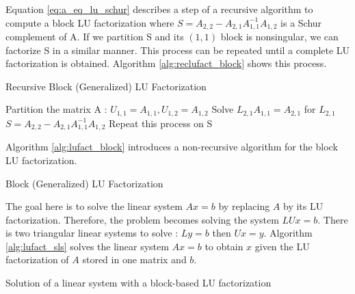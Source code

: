 Equation \ref{eq:a_eq_lu_schur} describes a step of a recursive algorithm to compute a block LU factorization where $S = A_{2,2} - A_{2,1}A_{1,1}^{-1}A_{1,2}$ is a Schur complement of A.
If we partition S and its $(1,1)$ block is nonsingular, we can factorize S in a similar manner.
This process can be repeated until a complete LU factorization is obtained.
Algorithm \ref{alg:reclufact_block} shows this process.


\begin{algorithm}[h]
	\DontPrintSemicolon
	\caption{Recursive Block (Generalized) LU Factorization\label{alg:reclufact_block}}
	Partition the matrix A : $U_{1,1} = A_{1,1},U_{1,2} = A_{1,2}$\;
	Solve $L_{2,1}A_{1,1} = A_{2,1}$ for $L_{2,1}$\;
	$S = A_{2,2} - A_{2,1}A_{1,1}^{-1}A_{1,2}$\;
	Repeat this process on S
\end{algorithm}

Algorithm \ref{alg:lufact_block} introduces a non-recursive algorithm for the block LU factorization.

\begin{algorithm}[h]
	\DontPrintSemicolon
	\caption{Block (Generalized) LU Factorization\label{alg:lufact_block}}
\end{algorithm}

The goal here is to solve the linear system $Ax = b$ by replacing $A$ by its LU factorization.
Therefore, the problem becomes solving the system $LUx=b$.
There is two triangular linear systems to solve : $Ly=b$ then $Ux=y$.
Algorithm \ref{alg:lufact_sls} solves the linear system $Ax = b$ to obtain $x$ given the LU factorization of $A$ stored in one matrix and $b$.

\begin{algorithm}[h]
	\DontPrintSemicolon
	\caption{Solution of a linear system with a block-based LU factorization\label{alg:lufact_sls}}
	\;
\end{algorithm}

